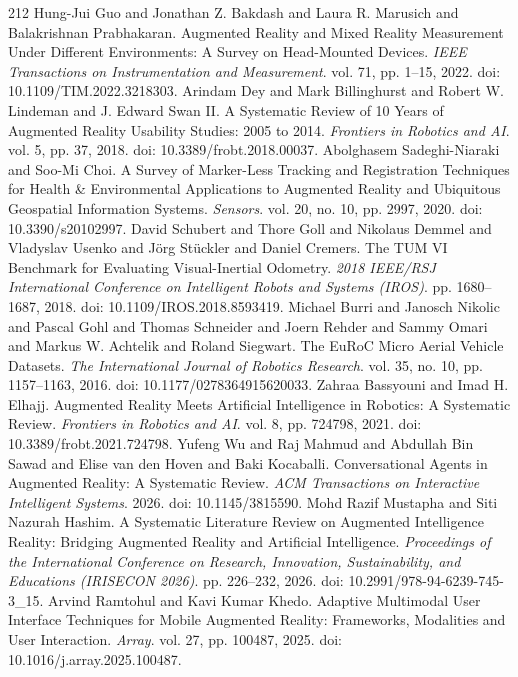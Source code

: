 \begin{thebibliography}{212}
 Hung-Jui Guo and Jonathan Z. Bakdash and Laura R. Marusich and Balakrishnan Prabhakaran. Augmented Reality and Mixed Reality Measurement Under Different Environments: A Survey on Head-Mounted Devices. \emph{IEEE Transactions on Instrumentation and Measurement}. vol. 71, pp. 1--15, 2022. doi: 10.1109/TIM.2022.3218303.
 Arindam Dey and Mark Billinghurst and Robert W. Lindeman and J. Edward Swan II. A Systematic Review of 10 Years of Augmented Reality Usability Studies: 2005 to 2014. \emph{Frontiers in Robotics and AI}. vol. 5, pp. 37, 2018. doi: 10.3389/frobt.2018.00037.
 Abolghasem Sadeghi-Niaraki and Soo-Mi Choi. A Survey of Marker-Less Tracking and Registration Techniques for Health \& Environmental Applications to Augmented Reality and Ubiquitous Geospatial Information Systems. \emph{Sensors}. vol. 20, no. 10, pp. 2997, 2020. doi: 10.3390/s20102997.
 David Schubert and Thore Goll and Nikolaus Demmel and Vladyslav Usenko and J{\"o}rg St{\"u}ckler and Daniel Cremers. The {TUM VI} Benchmark for Evaluating Visual-Inertial Odometry. \emph{2018 IEEE/RSJ International Conference on Intelligent Robots and Systems (IROS)}. pp. 1680--1687, 2018. doi: 10.1109/IROS.2018.8593419.
 Michael Burri and Janosch Nikolic and Pascal Gohl and Thomas Schneider and Joern Rehder and Sammy Omari and Markus W. Achtelik and Roland Siegwart. The {EuRoC} Micro Aerial Vehicle Datasets. \emph{The International Journal of Robotics Research}. vol. 35, no. 10, pp. 1157--1163, 2016. doi: 10.1177/0278364915620033.
 Zahraa Bassyouni and Imad H. Elhajj. Augmented Reality Meets Artificial Intelligence in Robotics: A Systematic Review. \emph{Frontiers in Robotics and AI}. vol. 8, pp. 724798, 2021. doi: 10.3389/frobt.2021.724798.
 Yufeng Wu and Raj Mahmud and Abdullah Bin Sawad and Elise van den Hoven and Baki Kocaballi. Conversational Agents in Augmented Reality: A Systematic Review. \emph{ACM Transactions on Interactive Intelligent Systems}. 2026. doi: 10.1145/3815590.
 Mohd Razif Mustapha and Siti Nazurah Hashim. A Systematic Literature Review on Augmented Intelligence Reality: Bridging Augmented Reality and Artificial Intelligence. \emph{Proceedings of the International Conference on Research, Innovation, Sustainability, and Educations (IRISECON 2026)}. pp. 226--232, 2026. doi: 10.2991/978-94-6239-745-3_15.
 Arvind Ramtohul and Kavi Kumar Khedo. Adaptive Multimodal User Interface Techniques for Mobile Augmented Reality: Frameworks, Modalities and User Interaction. \emph{Array}. vol. 27, pp. 100487, 2025. doi: 10.1016/j.array.2025.100487.

\end{thebibliography}
